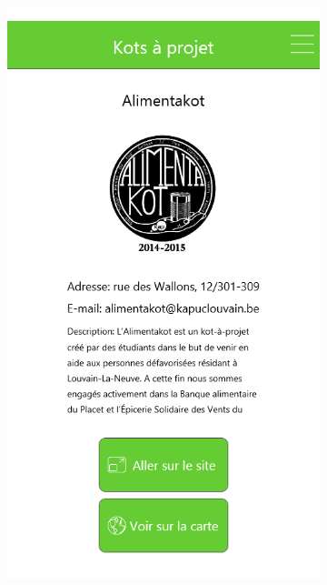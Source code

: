 \documentclass{eplmastersthesis}
\begin{document}
\begin{figure}[H]
\begin{subfigure}[b]{0.3\textwidth}
        \includegraphics[width=\textwidth]{Images/InVision/kapdetail.png}
    \end{subfigure}
    ~ %
    \begin{subfigure}[b]{0.3\textwidth}

\end{subfigure}
\end{figure}
\end{document}
